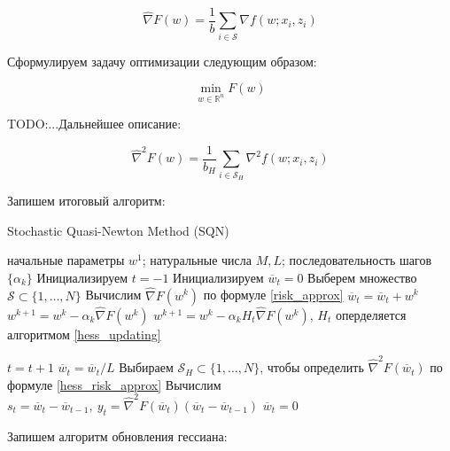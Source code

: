 \documentclass[]{scrartcl}
\begin{document}
\begin{equation}
\label{risk_approx}
\widehat{\nabla}F(w) = \frac{1}{b}\sum_{i\in \mathcal{S}}\nabla f(w; x_i, z_i)
\end{equation}

Сформулируем задачу оптимизации следующим образом:

\begin{equation}
\min_{w\in \mathbb{R}^n}F(w)
\end{equation}


TODO:...Дальнейшее описание:


\begin{equation}
\label{hess_risk_approx}
\widehat{\nabla}^2F(w) = \frac{1}{b_H}\sum_{i\in\mathcal{S}_H}\nabla^2f(w; x_i, z_i)
\end{equation}



Запишем итоговый алгоритм:

\begin{algorithm}[h!]
	\caption{Stochastic Quasi-Newton Method (SQN)}
	\label{SQN}
	\begin{algorithmic}[1]
		\REQUIRE начальные параметры $w^1$; натуральные числа $M, L$; последовательность шагов $\{\alpha_k\}$
		\STATE Инициализируем $t = -1$
		\STATE Инициализируем $\overline{w}_t = 0$		
		\STATE Выберем множество $\mathcal{S} \subset\{1, \ldots, N\}$
		\STATE Вычислим $\widehat{\nabla}F(w^k)$ по формуле \ref{risk_approx}
		\STATE $\overline{w}_t = \overline{w}_t + w^k$
			\STATE $w^{k+1} = w^k - \alpha_k \widehat{\nabla}F(w^k)$
		\ELSE 
			\STATE $w^{k+1} = w^k - \alpha_kH_t\widehat{\nabla}F(w^k)$, $H_t$ оперделяется алгоритмом \ref{hess_updating}
		\ENDIF
		
			\STATE $t = t+1$
			\STATE $\overline{w}_t = \overline{w}_t / L$
				\STATE Выбираем $\mathcal{S}_H \subset \{1,\ldots,N\}$, чтобы определить $\widehat{\nabla}^2F(\overline{w}_t)$ по формуле \ref{hess_risk_approx}
				 \STATE Вычислим $s_t = \overline{w}_t - \overline{w}_{t-1}, ~y_t = \widehat{\nabla}^2F(\overline{w}_t)(\overline{w}_t - \overline{w}_{t-1})$ \label{st_yt}
			\ENDIF
			\STATE $\overline{w}_t = 0$
		\ENDIF
		\ENDFOR
	\end{algorithmic}
\end{algorithm}

Запишем алгоритм обновления гессиана:
\end{document}
